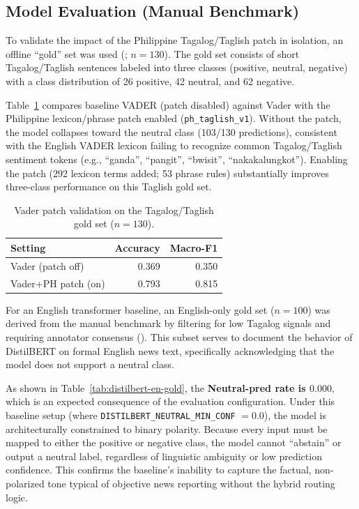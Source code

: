 \documentclass[sigconf, nonacm]{acmart}
\begin{document}
\subsection{Model Evaluation (Manual Benchmark)}
To validate the impact of the Philippine Tagalog/Taglish patch in isolation, an offline ``gold'' set was used (; $n=130$). The gold set consists of short Tagalog/Taglish sentences labeled into three classes (positive, neutral, negative) with a class distribution of 26 positive, 42 neutral, and 62 negative.

Table~\ref{tab:vader-ph-gold} compares baseline VADER (patch disabled) against Vader with the Philippine lexicon/phrase patch enabled (\texttt{ph\_taglish\_v1}). Without the patch, the model collapses toward the neutral class (103/130 predictions), consistent with the English VADER lexicon failing to recognize common Tagalog/Taglish sentiment tokens (e.g., ``ganda'', ``pangit'', ``bwisit'', ``nakakalungkot''). Enabling the patch (292 lexicon terms added; 53 phrase rules) substantially improves three-class performance on this Taglish gold set.

\begin{table}[h]
  \caption{Vader patch validation on the Tagalog/Taglish gold set ($n=130$).}
  \label{tab:vader-ph-gold}
  \centering
  \small
  \setlength{\tabcolsep}{3.5pt}
  \begin{tabular}{@{}lrr@{}}
      \toprule
      Setting & Accuracy & Macro-F1 \\
      \midrule
      Vader (patch off) & 0.369 & 0.350 \\
      Vader+PH patch (on) & 0.793 & 0.815 \\
      \bottomrule
    \end{tabular}
\end{table}

For an English transformer baseline, an English-only gold set ($n=100$) was derived from the manual benchmark by filtering for low Tagalog signals and requiring annotator consensus (). This subset serves to document the behavior of DistilBERT on formal English news text, specifically acknowledging that the model does not support a neutral class.

As shown in Table~\ref{tab:distilbert-en-gold}, the \textbf{Neutral-pred rate is $0.000$}, which is an expected consequence of the evaluation configuration. Under this baseline setup (where \texttt{DISTILBERT\_NEUTRAL\_MIN\_CONF} $= 0.0$), the model is architecturally constrained to binary polarity. Because every input must be mapped to either the positive or negative class, the model cannot ``abstain'' or output a neutral label, regardless of linguistic ambiguity or low prediction confidence. This confirms the baseline’s inability to capture the factual, non-polarized tone typical of objective news reporting without the hybrid routing logic.
\end{document}
